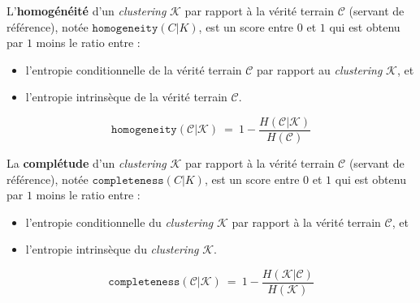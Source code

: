 		\newpage
		L'\textbf{homogénéité} d'un \textit{clustering} $\mathcal{K}$ par rapport à la vérité terrain $\mathcal{C}$ (servant de référence), notée $\texttt{homogeneity}(C|K)$, est un score entre $0$ et $1$ qui est obtenu par $1$ moins le ratio entre :
		\begin{itemize}
			\item l'entropie conditionnelle de la vérité terrain $\mathcal{C}$ par rapport au \textit{clustering} $\mathcal{K}$, et
			\item l'entropie intrinsèque de la vérité terrain $\mathcal{C}$.
		\end{itemize}
		
		\begin{equation}
			\label{equation:D.1-ANNEXE-EVALUATION-CLUSTERING-DEFINITION-HOMEGENEITE}
			\texttt{homogeneity}(\mathcal{C}|\mathcal{K})~=~
				1
				-
				\frac{
					H(\mathcal{C}|\mathcal{K})
				}{
					H(\mathcal{C})
				}
		\end{equation}
		
		La \textbf{complétude} d'un \textit{clustering} $\mathcal{K}$ par rapport à la vérité terrain $\mathcal{C}$ (servant de référence), notée $\texttt{completeness}(C|K)$, est un score entre $0$ et $1$ qui est obtenu par $1$ moins le ratio entre :
		\begin{itemize}
			\item l'entropie conditionnelle du \textit{clustering} $\mathcal{K}$ par rapport à la vérité terrain $\mathcal{C}$, et
			\item l'entropie intrinsèque du \textit{clustering} $\mathcal{K}$.
		\end{itemize}
		
		\begin{equation}
			\label{equation:D.1-ANNEXE-EVALUATION-CLUSTERING-DEFINITION-COMPLETENESS}
			\texttt{completeness}(\mathcal{C}|\mathcal{K})~=~
				1
				-
				\frac{
					H(\mathcal{K}|\mathcal{C})
				}{
					H(\mathcal{K})
				}
		\end{equation}
		
